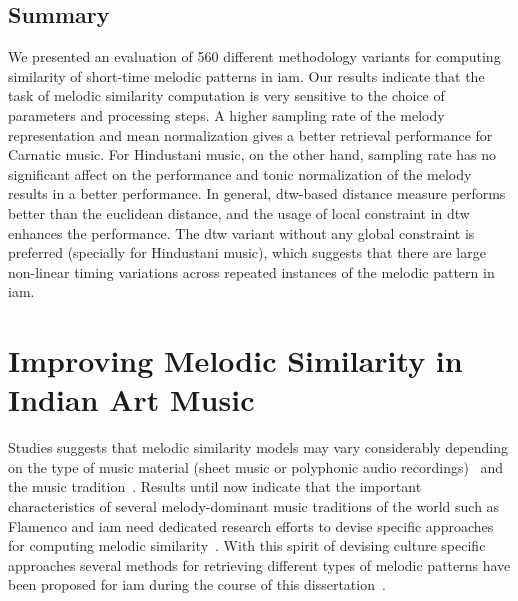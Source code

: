 \subsection{Summary}
\label{sec:patterns_melodic_similarity_summary}

We presented an evaluation of 560 different methodology variants for computing similarity of short-time melodic patterns in \gls{iam}. Our results indicate that the task of melodic similarity computation is very sensitive to the choice of parameters and processing steps. A higher sampling rate of the melody representation and mean normalization gives a better retrieval performance for Carnatic music. For Hindustani music, on the other hand, sampling rate has no significant affect on the performance and tonic normalization of the melody results in a better performance. In general, \gls{dtw}-based distance measure performs better than the euclidean distance, and the usage of local constraint in \gls{dtw} enhances the performance. The \gls{dtw} variant without any global constraint is preferred (specially for Hindustani music), which suggests that there are large non-linear timing variations across repeated instances of the melodic pattern in \gls{iam}. 




\section{Improving Melodic Similarity in Indian Art Music}
\label{sec:patterns_improving_melodic_similarity}

Studies suggests that melodic similarity models may vary considerably depending on the type of music material (sheet music or polyphonic audio recordings)~\citep{Marsden2012, collins2014bridging, ghias1995query} and the music tradition~\citep{Juhasz2009a, Conklin2010a}. Results until now indicate that the important characteristics of several melody-dominant music traditions of the world such as Flamenco and \gls{iam} need dedicated research efforts to devise specific approaches for computing melodic similarity~\citep{Pikrakis2012, Rao2014}. With this spirit of devising culture specific approaches several methods for retrieving different types of melodic patterns have been proposed for \gls{iam} during the course of this dissertation~\citep{Ross2012b,Ross2012,ishwar2012motivic,Rao2014,Ishwar2013,Dutta2014}. 


